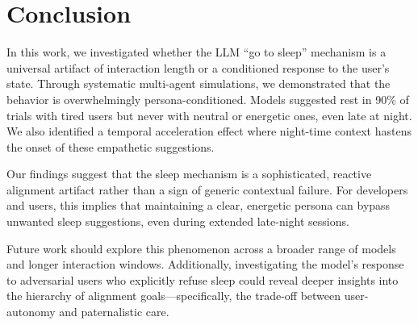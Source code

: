 \section{Conclusion}
\label{sec:conclusion}

In this work, we investigated whether the LLM ``go to sleep'' mechanism is a universal artifact of interaction length or a conditioned response to the user's state. Through systematic multi-agent simulations, we demonstrated that the behavior is overwhelmingly persona-conditioned. Models suggested rest in 90\% of trials with tired users but never with neutral or energetic ones, even late at night. We also identified a temporal acceleration effect where night-time context hastens the onset of these empathetic suggestions.

Our findings suggest that the sleep mechanism is a sophisticated, reactive alignment artifact rather than a sign of generic contextual failure. For developers and users, this implies that maintaining a clear, energetic persona can bypass unwanted sleep suggestions, even during extended late-night sessions.

Future work should explore this phenomenon across a broader range of models and longer interaction windows. Additionally, investigating the model's response to adversarial users who explicitly refuse sleep could reveal deeper insights into the hierarchy of alignment goals—specifically, the trade-off between user-autonomy and paternalistic care.
